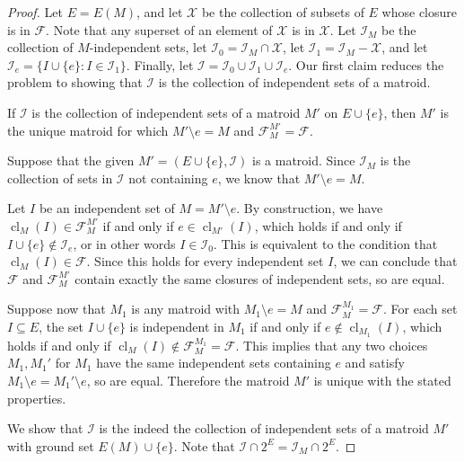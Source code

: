 \documentclass[10pt,a4paper]{amsart}
\newcommand{\cF}{\mathcal{F}}
\newcommand{\cI}{\mathcal{I}}
\newcommand{\cX}{\mathcal{X}}
\DeclareMathOperator{\cl}{cl}
\newcommand{\del}{\!\setminus\!}
\begin{document}
\begin{proof}
  Let $E = E(M)$, and let $\cX$ be the collection of subsets of $E$ whose closure is in $\cF$. 
  Note that any superset of an element of $\cX$ is in $\cX$. 
  Let $\cI_M$ be the collection of $M$-independent sets, 
  let $\cI_0 = \cI_M \cap \cX$, let $\cI_1 = \cI_M - \cX$, and let $\cI_e = \{I \cup \{e\} : I \in \cI_1\}$. 
  Finally, let $\cI = \cI_0 \cup \cI_1 \cup \cI_e$. 
  Our first claim reduces the problem to showing that $\cI$ is the collection of independent 
  sets of a matroid. 
  
  \begin{claim}\label{ismatroid}
    If $\cI$ is the collection of independent sets of a matroid $M'$ on $E \cup \{e\}$, 
    then $M'$ is the unique matroid for which $M' \del e = M$ and $\cF_M^{M'} = \cF$.
  \end{claim}
  \begin{subproof}
    Suppose that the given $M' = (E \cup \{e\}, \cI)$ is a matroid. 
    Since $\cI_M$ is the collection of sets in $\cI$ not containing $e$, we know that $M' \del e = M$. 

    Let $I$ be an independent set of $M = M' \del e$. 
    By construction, we have $\cl_M(I) \in \cF_{M}^{M'}$ if and only if $e \in \cl_{M'}(I)$, 
    which holds if and only if $I \cup \{e\} \notin \cI_e$, or in other words $I \in \cI_0$. 
    This is equivalent to the condition that $\cl_M(I) \in \cF$. Since this holds for every 
    independent set $I$, we can conclude that $\cF$ and $\cF_{M}^{M'}$ contain exactly 
    the same closures of independent sets, so are equal. 

    Suppose now that $M_1$ is any matroid with $M_1 \del e = M$ and $\cF_{M}^{M_1} = \cF$. 
    For each set $I \subseteq E$, the set $I \cup \{e\}$ is independent in $M_1$ 
    if and only if $e \notin \cl_{M_1}(I)$, which holds if and only if 
    $\cl_M(I) \notin \cF_{M}^{M_1} = \cF$. This implies that any two choices $M_1, M_1'$ for $M_1$ 
    have the same independent sets containing $e$ and satisfy $M_1 \del e = M_1' \del e$, 
    so are equal. Therefore the matroid $M'$ is unique with the stated properties. 
  \end{subproof}
  
  We show that $\cI$ is the indeed the collection of independent sets of a matroid $M'$ with ground set $E(M) \cup \{e\}$. 
  Note that $\cI \cap 2^{E} = \cI_{M} \cap 2^E$. 
  
  



\end{proof}
\end{document}
